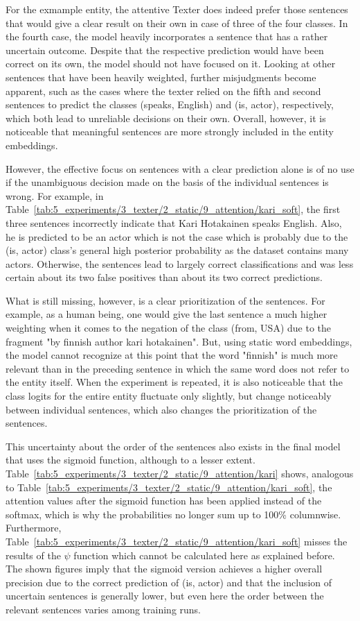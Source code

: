For the exmample entity, the attentive Texter does indeed prefer those sentences that would give a clear result on their own in case of three of the four classes. In the fourth case, the model heavily incorporates a sentence that has a rather uncertain outcome. Despite that the respective prediction would have been correct on its own, the model should not have focused on it. Looking at other sentences that have been heavily weighted, further misjudgments become apparent, such as the cases where the texter relied on the fifth and second sentences to predict the classes (speaks, English) and (is, actor), respectively, which both lead to unreliable decisions on their own. Overall, however, it is noticeable that meaningful sentences are more strongly included in the entity embeddings.

However, the effective focus on sentences with a clear prediction alone is of no use if the unambiguous decision made on the basis of the individual sentences is wrong. For example, in Table~\ref{tab:5_experiments/3_texter/2_static/9_attention/kari_soft}, the first three sentences incorrectly indicate that Kari Hotakainen speaks English. Also, he is predicted to be an actor which is not the case which is probably due to the (is, actor) class's general high posterior probability as the dataset contains many actors. Otherwise, the sentences lead to largely correct classifications and was less certain about its two false positives than about its two correct predictions.

What is still missing, however, is a clear prioritization of the sentences. For example, as a human being, one would give the last sentence a much higher weighting when it comes to the negation of the class (from, USA) due to the fragment "by finnish author kari hotakainen". But, using static word embeddings, the model cannot recognize at this point that the word "finnish" is much more relevant than in the preceding sentence in which the same word does not refer to the entity itself. When the experiment is repeated, it is also noticeable that the class logits for the entire entity fluctuate only slightly, but change noticeably between individual sentences, which also changes the prioritization of the sentences.

This uncertainty about the order of the sentences also exists in the final model that uses the sigmoid function, although to a lesser extent. Table~\ref{tab:5_experiments/3_texter/2_static/9_attention/kari} shows, analogous to Table~\ref{tab:5_experiments/3_texter/2_static/9_attention/kari_soft}, the attention values after the sigmoid function has been applied instead of the softmax, which is why the probabilities no longer sum up to 100\% columnwise. Furthermore, Table~\ref{tab:5_experiments/3_texter/2_static/9_attention/kari_soft} misses the results of the $\psi$ function which cannot be calculated here as explained before. The shown figures imply that the sigmoid version achieves a higher overall precision due to the correct prediction of (is, actor) and that the inclusion of uncertain sentences is generally lower, but even here the order between the relevant sentences varies among training runs.

